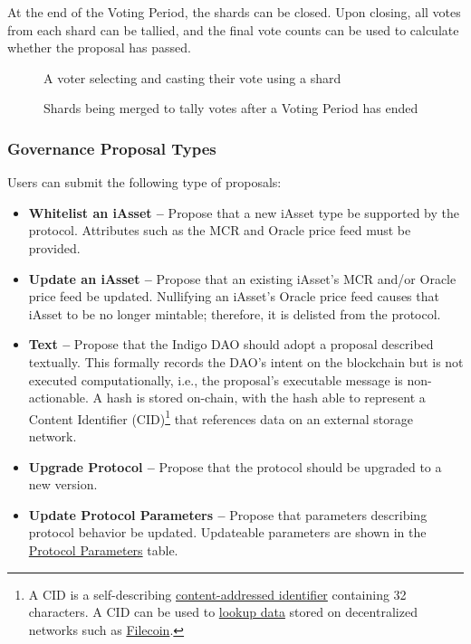 \documentclass{article}
\begin{document}
\begin{sloppypar}
At the end of the Voting Period, the shards can be closed. Upon closing,
all votes from each shard can be tallied, and the final vote counts can
be used to calculate whether the proposal has passed.

\filbreak

\hypertarget{governance-shards}{%
\begin{figure}[htbp]
\centering

\caption{A voter selecting and casting their vote using a shard}
\label{governance-shards}
\end{figure}}

\hypertarget{governance-merge-shards-tally}{%
\begin{figure}[htbp]
\centering

\caption{Shards being merged to tally votes after a Voting Period
has ended}
\label{governance-merge-shards-tally}
\end{figure}}

\hypertarget{governance-proposal-types}{%
\subsubsection{Governance Proposal
Types}\label{governance-proposal-types}}

Users can submit the following type of proposals:

\begin{itemize}
\item
  \textbf{Whitelist an iAsset --} Propose that a new iAsset type be
  supported by the protocol. Attributes such as the MCR and Oracle price
  feed must be provided.
\item
  \textbf{Update an iAsset --} Propose that an existing iAsset's MCR
  and/or Oracle price feed be updated. Nullifying an iAsset's Oracle
  price feed causes that iAsset to be no longer mintable; therefore, it
  is delisted from the protocol.
\item
  \textbf{Text --} Propose that the Indigo DAO should adopt a proposal
  described textually. This formally records the DAO's intent on the
  blockchain but is not executed computationally, i.e., the proposal's
  executable message is non-actionable. A hash is stored on-chain, with
  the hash able to represent a Content Identifier (CID)\footnote{A CID
    is a self-describing
    \href{https://github.com/multiformats/cid}{content-addressed
    identifier} containing 32 characters. A CID can be used to
    \href{https://filecoin.tools/}{lookup data} stored on decentralized
    networks such as \href{https://filecoin.io/}{Filecoin}.} that
  references data on an external storage network.
\item
  \textbf{Upgrade Protocol --} Propose that the protocol should be
  upgraded to a new version.
\item
  \textbf{Update Protocol Parameters --} Propose that parameters
  describing protocol behavior be updated. Updateable parameters are
  shown in the \protect\hyperlink{protocol-parameters}{Protocol
  Parameters} table.
\end{itemize}


\end{sloppypar}
\end{document}
